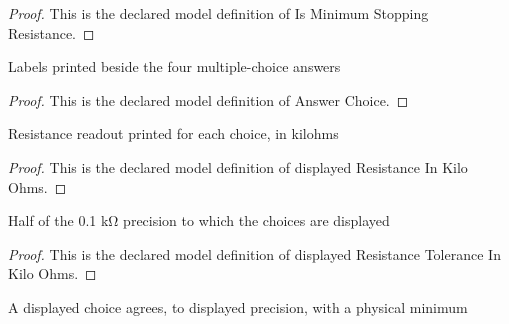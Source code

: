 \begin{proof}
  This is the declared model definition of Is Minimum Stopping Resistance.
\end{proof}
\begin{definition}
  \label{def:physics:phyx-mini-0612:phyxminiproblems-problemphyxmini0612-answerchoice}
  Labels printed beside the four multiple-choice answers
\end{definition}
\begin{proof}
  This is the declared model definition of Answer Choice.
\end{proof}
\begin{definition}
  \label{def:physics:phyx-mini-0612:phyxminiproblems-problemphyxmini0612-displayedresistanceinkiloohms}
  Resistance readout printed for each choice, in kilohms
\end{definition}
\begin{proof}
  This is the declared model definition of displayed Resistance In Kilo Ohms.
\end{proof}
\begin{definition}
  \label{def:physics:phyx-mini-0612:phyxminiproblems-problemphyxmini0612-displayedresistancetoleranceinkiloohms}
  Half of the 0.1 kΩ precision to which the choices are displayed
\end{definition}
\begin{proof}
  This is the declared model definition of displayed Resistance Tolerance In Kilo Ohms.
\end{proof}
\begin{definition}
  \label{def:physics:phyx-mini-0612:phyxminiproblems-problemphyxmini0612-matchesdisplayedminimumstoppingresistance}
  A displayed choice agrees, to displayed precision, with a physical minimum
\end{definition}
